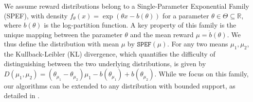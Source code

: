 \documentclass{article}
\begin{document}
We assume reward distributions belong to a Single-Parameter Exponential Family (SPEF), with density $f_{\theta}(x)=\exp(\theta x-b(\theta))$ for a parameter $\theta \in \Theta \subseteq \mathbb{R}$, where $b(\theta)$ is the log-partition function. A key property of this family is the unique mapping between the parameter $\theta$ and the mean reward $\mu = \dot{b}(\theta)$. We thus define the distribution with mean $\mu$ by $\texttt{SPEF}(\mu)$. For any two means $\mu_1, \mu_2$, the Kullback-Leibler (KL) divergence, which quantifies the difficulty of distinguishing between the two underlying distributions, is given by $D(\mu_1,\mu_2)=(\theta_{\mu_1}-\theta_{\mu_2})\mu_1- b(\theta_{\mu_1})+b(\theta_{\mu_2})$. While we focus on this family, our algorithms can be extended to any distribution with bounded support, as detailed in \cite[Appendix I]{bandyopadhyay2024optimal}.
\end{document}
